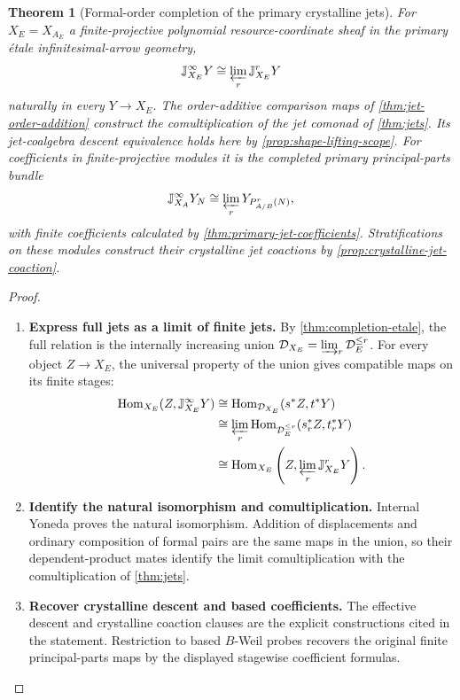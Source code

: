 \documentclass[11pt,a4paper]{article}
\numberwithin{algorithm}{section}
\numberwithin{equation}{section}
\newtheorem{theorem}{Theorem}[section]
\theoremstyle{definition}
\theoremstyle{remark}
\theoremstyle{plain}
\newcommand{\Hom}{\operatorname{Hom}}
\theoremstyle{definition}
\theoremstyle{plain}
\begin{document}
\begin{theorem}[Formal-order completion of the primary crystalline jets]
\label{thm:completed-jet-comparison}
For $X_E=X_{A_E}$ a finite-projective polynomial resource-coordinate
sheaf in the primary \'etale infinitesimal-arrow geometry,
\begin{equation}\label{eq:completed-jet-comparison}
 \mathbb J_{X_E}^\infty Y\cong
 \varprojlim_r\mathbb J_{X_E}^rY
\end{equation}
naturally in every $Y\to X_E$.  The order-additive
comparison maps of \cref{thm:jet-order-addition} construct the
comultiplication of the jet comonad of
\cref{thm:jets}.  Its jet-coalgebra descent equivalence
holds here by \cref{prop:shape-lifting-scope}.  For coefficients in finite-projective modules it is the completed
primary principal-parts bundle
\[
 \mathbb J_{X_A}^\infty Y_N
 \cong\varprojlim_rY_{P^r_{A/B}(N)},
\]
with finite coefficients calculated by
\cref{thm:primary-jet-coefficients}.  Stratifications on these modules
construct their crystalline jet coactions by
\cref{prop:crystalline-jet-coaction}.
\end{theorem}
\begin{proof}\leavevmode
\begin{enumerate}[leftmargin=*,align=left]
\item \textbf{Express full jets as a limit of finite jets.}
By \cref{thm:completion-etale}, the full relation is the
internally increasing union
$\mathcal D_{X_E}=\varinjlim_r\mathcal D_E^{\le r}$.
For every object $Z\to X_E$, the universal property of the
union gives compatible maps on its finite stages:
\[
\begin{aligned}
 \Hom_{X_E}(Z,\mathbb J_{X_E}^\infty Y)
 &\cong\Hom_{\mathcal D_{X_E}}(s^*Z,t^*Y)\\
 &\cong\varprojlim_r
       \Hom_{\mathcal D_E^{\le r}}(s_r^*Z,t_r^*Y)\\
 &\cong\Hom_{X_E}
       \left(Z,\varprojlim_r\mathbb J_{X_E}^rY\right).
\end{aligned}
\]

\item \textbf{Identify the natural isomorphism and comultiplication.}
Internal Yoneda proves the natural isomorphism.  Addition
of displacements and ordinary composition of formal pairs
are the same maps in the union, so their dependent-product
mates identify the limit comultiplication with the
comultiplication of \cref{thm:jets}.

\item \textbf{Recover crystalline descent and based coefficients.}
The effective descent
and crystalline coaction clauses are the explicit constructions
cited in the statement.  Restriction to based $B$-Weil
probes recovers the original finite principal-parts maps by the
displayed stagewise coefficient formulas.
\end{enumerate}
\end{proof}
\end{document}
